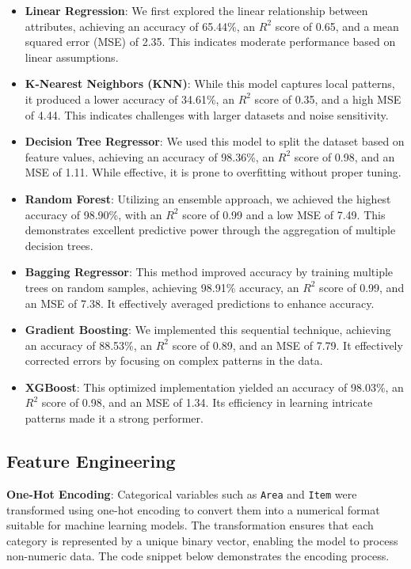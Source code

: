 \documentclass[10pt,twocolumn,letterpaper]{article}
\begin{document}
\begin{itemize}
    \item \textbf{Linear Regression}: We first explored the linear relationship between attributes, achieving an accuracy of 65.44\%, an \( R^2 \) score of 0.65, and a mean squared error (MSE) of 2.35. This indicates moderate performance based on linear assumptions.
    
    \item \textbf{K-Nearest Neighbors (KNN)}: While this model captures local patterns, it produced a lower accuracy of 34.61\%, an \( R^2 \) score of 0.35, and a high MSE of 4.44. This indicates challenges with larger datasets and noise sensitivity.

    \item \textbf{Decision Tree Regressor}: We used this model to split the dataset based on feature values, achieving an accuracy of 98.36\%, an \( R^2 \) score of 0.98, and an MSE of 1.11. While effective, it is prone to overfitting without proper tuning.

    \item \textbf{Random Forest}: Utilizing an ensemble approach, we achieved the highest accuracy of 98.90\%, with an \( R^2 \) score of 0.99 and a low MSE of 7.49. This demonstrates excellent predictive power through the aggregation of multiple decision trees.

    \item \textbf{Bagging Regressor}: This method improved accuracy by training multiple trees on random samples, achieving 98.91\% accuracy, an \( R^2 \) score of 0.99, and an MSE of 7.38. It effectively averaged predictions to enhance accuracy.

    \item \textbf{Gradient Boosting}: We implemented this sequential technique, achieving an accuracy of 88.53\%, an \( R^2 \) score of 0.89, and an MSE of 7.79. It effectively corrected errors by focusing on complex patterns in the data.

    \item \textbf{XGBoost}: This optimized implementation yielded an accuracy of 98.03\%, an \( R^2 \) score of 0.98, and an MSE of 1.34. Its efficiency in learning intricate patterns made it a strong performer.
\end{itemize}
\vspace{-20 pt}

\subsection{Feature Engineering}
\textbf{One-Hot Encoding}: Categorical variables such as \texttt{Area} and \texttt{Item} were transformed using one-hot encoding to convert them into a numerical format suitable for machine learning models. The transformation ensures that each category is represented by a unique binary vector, enabling the model to process non-numeric data. The code snippet below demonstrates the encoding process.
\end{document}
